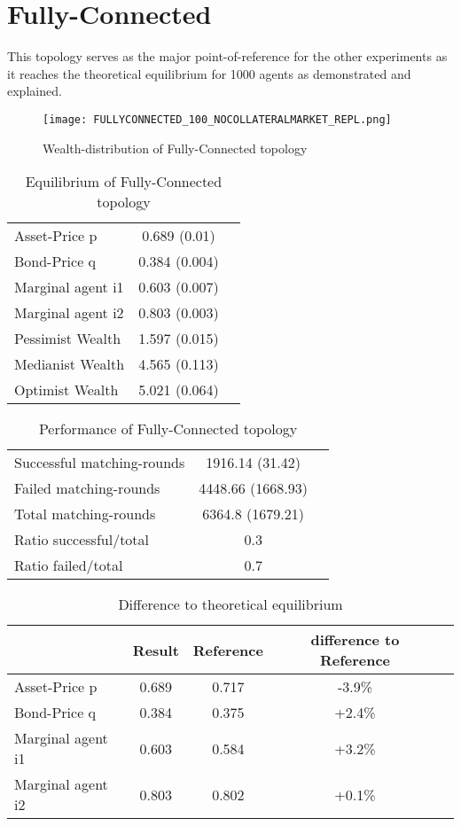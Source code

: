 \documentclass[Bachelorarbeit.tex]{subfiles}
\begin{document}
\section{Fully-Connected}
This topology serves as the major point-of-reference for the other experiments as it reaches the theoretical equilibrium for 1000 agents as demonstrated and explained.

\begin{figure}[H]
	\centering
  \texttt{[image: FULLYCONNECTED\_100\_NOCOLLATERALMARKET\_REPL.png]}
	\caption{Wealth-distribution of Fully-Connected topology}
	\label{fig:wealth_FULLYCONNECTED_100_NOCOLLATERALMARKET_REPL}
\end{figure}

\begin{table}[H]
	\caption{Equilibrium of Fully-Connected topology}
	\centering
	\begin{tabular} { l c r }
		\hline
		Asset-Price p & 0.689 (0.01) \\
		Bond-Price q & 0.384 (0.004) \\
		Marginal agent i1 & 0.603 (0.007) \\
		Marginal agent i2 & 0.803 (0.003) \\
		\hline
		Pessimist Wealth & 1.597 (0.015) \\
		Medianist Wealth & 4.565 (0.113) \\
		Optimist Wealth & 5.021 (0.064) \\
		\hline
	\end{tabular}
	\label{tab:fullyconnected_equilibrium_100Agents_05Bond}
\end{table} 

\begin{table}[H]
	\caption{Performance of Fully-Connected topology}
	\centering
	\begin{tabular} { l c r }
		\hline
		Successful matching-rounds & 1916.14 (31.42) \\
		Failed matching-rounds & 4448.66 (1668.93) \\
		Total matching-rounds & 6364.8 (1679.21) \\
		\hline
		Ratio successful/total & 0.3 \\
		Ratio failed/total & 0.7 \\
		\hline
	\end{tabular}
\end{table}

\begin{table}[H]
	\caption{Difference to theoretical equilibrium}
	\centering
	\begin{tabular} { l c c c r }
		& Result & Reference & difference to Reference \\
		\hline
		Asset-Price p & 0.689 & 0.717 & -3.9\% \\
		Bond-Price q & 0.384 & 0.375 & +2.4\% \\
		Marginal agent i1 & 0.603  & 0.584 & +3.2\% \\
		Marginal agent i2 & 0.803 & 0.802 & +0.1\% \\
		\hline
	\end{tabular}
\end{table}
\end{document}
